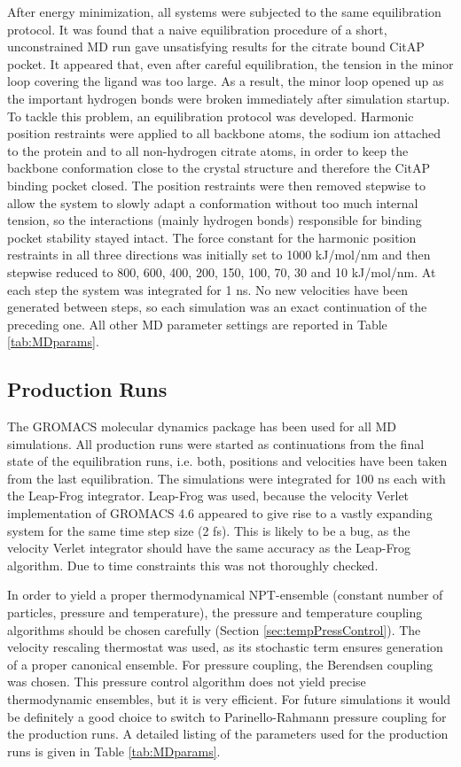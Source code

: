 \documentclass[english, a4paper, 12pt, titlepage, draft]{article}
\begin{document}
After energy minimization, all systems were subjected to the same equilibration protocol.
It was found that a naive equilibration procedure of a short, unconstrained MD run gave unsatisfying results for the citrate bound CitAP pocket.
It appeared that, even after careful equilibration, the tension in the minor loop covering the ligand was too large.
As a result, the minor loop opened up as the important hydrogen bonds were broken immediately after simulation startup.
To tackle this problem, an equilibration protocol was developed.
Harmonic position restraints were applied to all backbone atoms, the sodium ion attached to the protein and to all non-hydrogen citrate atoms, in order to keep the backbone conformation close to the crystal structure and therefore the CitAP binding pocket closed.
The position restraints were then removed stepwise to allow the system to slowly adapt a conformation without too much internal tension, so the interactions (mainly hydrogen bonds) responsible for binding pocket stability stayed intact.
The force constant for the harmonic position restraints in all three directions was initially set to 1000 kJ/mol/nm and then stepwise reduced to 800, 600, 400, 200, 150, 100, 70, 30 and 10 kJ/mol/nm.
At each step the system was integrated for 1 ns.
No new velocities have been generated between steps, so each simulation was an exact continuation of the preceding one.
All other MD parameter settings are reported in Table \ref{tab:MDparams}.



\subsection{Production Runs}

The GROMACS molecular dynamics package \cite{GROMACS4} has been used for all MD simulations.
All production runs were started as continuations from the final state of the equilibration runs, i.e. both, positions and velocities have been taken from the last equilibration.
The simulations were integrated for 100 ns each with the Leap-Frog integrator.
Leap-Frog was used, because the velocity Verlet implementation of GROMACS 4.6 appeared to give rise to a vastly expanding system for the same time step size (2 fs).
This is likely to be a bug, as the velocity Verlet integrator should have the same accuracy as the Leap-Frog algorithm.
Due to time constraints this was not thoroughly checked.

In order to yield a proper thermodynamical NPT-ensemble (constant number of particles, pressure and temperature), the pressure and temperature coupling algorithms should be chosen carefully (Section \ref{sec:tempPressControl}).
The velocity rescaling thermostat was used, as its stochastic term ensures generation of a proper canonical ensemble.
For pressure coupling, the Berendsen coupling was chosen.
This pressure control algorithm does not yield precise thermodynamic ensembles, but it is very efficient.
For future simulations it would be definitely a good choice to switch to Parinello-Rahmann pressure coupling for the production runs.
A detailed listing of the parameters used for the production runs is given in Table \ref{tab:MDparams}.
\end{document}
